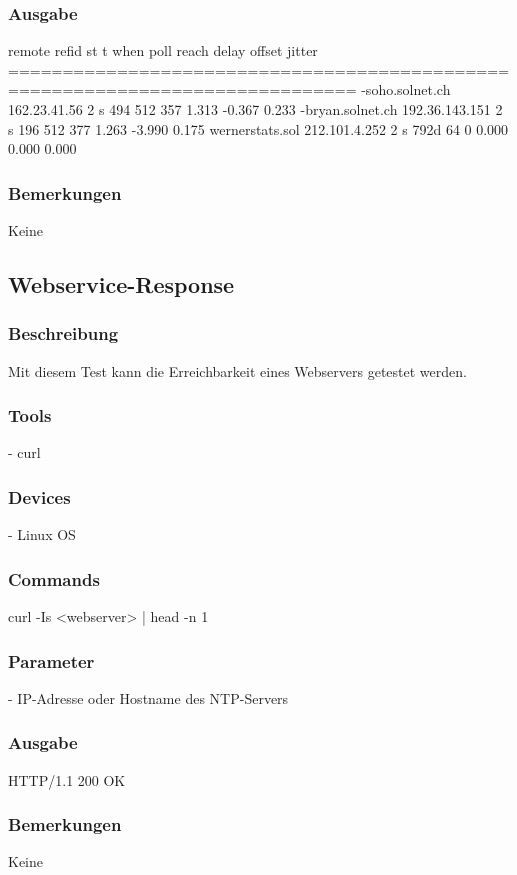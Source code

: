 \documentclass[a4,12pt]{scrartcl}
\begin{document}
\subsubsection{Ausgabe}
     remote           refid      st t when poll reach   delay   offset  jitter\newline
==============================================================================\newline
-soho.solnet.ch  162.23.41.56     2 s  494  512  357    1.313   -0.367   0.233\newline
-bryan.solnet.ch 192.36.143.151   2 s  196  512  377    1.263   -3.990   0.175\newline
 wernerstats.sol 212.101.4.252    2 s 792d   64    0    0.000    0.000   0.000\newline \subsubsection{Bemerkungen}
Keine


\subsection{Webservice-Response}
\subsubsection{Beschreibung}
Mit diesem Test kann die Erreichbarkeit eines Webservers getestet werden.
\subsubsection{Tools}
- curl
\subsubsection{Devices}
- Linux OS
\subsubsection{Commands}
curl -Is <webserver> | head -n 1
\subsubsection{Parameter}
- IP-Adresse oder Hostname des NTP-Servers
\subsubsection{Ausgabe}
HTTP/1.1 200 OK
\subsubsection{Bemerkungen}
Keine
\end{document}
